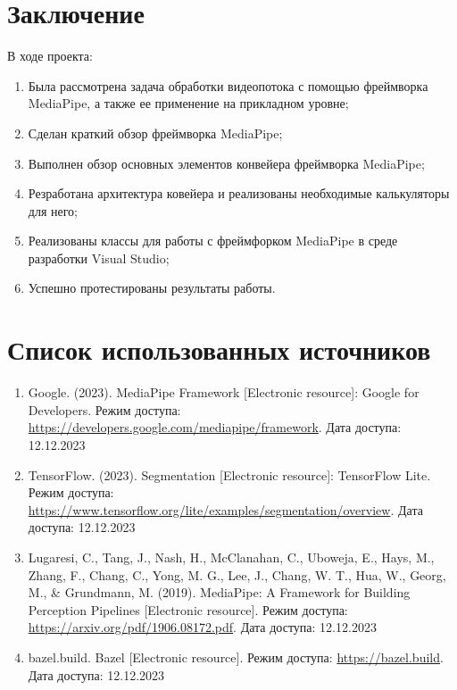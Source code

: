 \documentclass[a4paper,14pt]{extreport}
\begin{document}
    \chapter*{Заключение}
    В ходе проекта:
    \begin{enumerate}
        \item Была рассмотрена задача обработки видеопотока с помощью фреймворка MediaPipe, а также ее применение на прикладном уровне;
        \item Сделан краткий обзор фреймворка MediaPipe;
        \item Выполнен обзор основных элементов конвейера фреймворка MediaPipe;
        \item Резработана архитектура ковейера и реализованы необходимые калькуляторы для него;
        \item Реализованы классы для работы с фреймфорком MediaPipe в среде разработки Visual Studio;
        \item Успешно протестированы результаты работы.
    \end{enumerate}

    \chapter*{Список использованных источников}
    \begin{enumerate}
        \item Google. (2023). MediaPipe Framework [Electronic resource]: Google for Developers. Режим доступа: \href{https://developers.google.com/mediapipe/framework}{https://developers.google.com/mediapipe/framework}. Дата доступа: 12.12.2023
        \item TensorFlow. (2023). Segmentation [Electronic resource]: TensorFlow Lite. Режим доступа: \href{https://www.tensorflow.org/lite/examples/segmentation/overview}{https://www.tensorflow.org/lite/examples/segmentation/overview}. Дата доступа: 12.12.2023
        \item Lugaresi, C., Tang, J., Nash, H., McClanahan, C., Uboweja, E., Hays, M., Zhang, F., Chang, C., Yong, M. G., Lee, J., Chang, W. T., Hua, W., Georg, M., & Grundmann, M. (2019). MediaPipe: A Framework for Building Perception Pipelines [Electronic resource]. Режим доступа: \href{https://arxiv.org/pdf/1906.08172.pdf}{https://arxiv.org/pdf/1906.08172.pdf}. Дата доступа: 12.12.2023
        \item bazel.build. Bazel [Electronic resource]. Режим доступа: \href{https://bazel.build}{https://bazel.build}. Дата доступа: 12.12.2023
    \end{enumerate}
    
\end{document}
